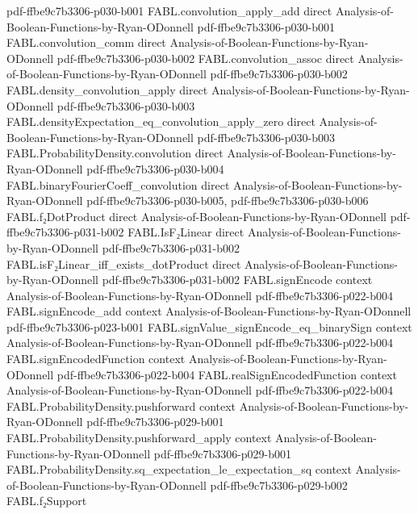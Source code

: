 \begin{theorem}
  {pdf-ffbe9c7b3306-p030-b001}
\proofstep
  {FABL.convolution_apply_add}
  {direct}
  {Analysis-of-Boolean-Functions-by-Ryan-ODonnell}
  {pdf-ffbe9c7b3306-p030-b001}
\proofstep
  {FABL.convolution_comm}
  {direct}
  {Analysis-of-Boolean-Functions-by-Ryan-ODonnell}
  {pdf-ffbe9c7b3306-p030-b002}
\proofstep
  {FABL.convolution_assoc}
  {direct}
  {Analysis-of-Boolean-Functions-by-Ryan-ODonnell}
  {pdf-ffbe9c7b3306-p030-b002}
\proofstep
  {FABL.density_convolution_apply}
  {direct}
  {Analysis-of-Boolean-Functions-by-Ryan-ODonnell}
  {pdf-ffbe9c7b3306-p030-b003}
\proofstep
  {FABL.densityExpectation_eq_convolution_apply_zero}
  {direct}
  {Analysis-of-Boolean-Functions-by-Ryan-ODonnell}
  {pdf-ffbe9c7b3306-p030-b003}
\proofstep
  {FABL.ProbabilityDensity.convolution}
  {direct}
  {Analysis-of-Boolean-Functions-by-Ryan-ODonnell}
  {pdf-ffbe9c7b3306-p030-b004}
\proofstep
  {FABL.binaryFourierCoeff_convolution}
  {direct}
  {Analysis-of-Boolean-Functions-by-Ryan-ODonnell}
  {pdf-ffbe9c7b3306-p030-b005,
    pdf-ffbe9c7b3306-p030-b006}
\proofstep
  {FABL.f₂DotProduct}
  {direct}
  {Analysis-of-Boolean-Functions-by-Ryan-ODonnell}
  {pdf-ffbe9c7b3306-p031-b002}
\proofstep
  {FABL.IsF₂Linear}
  {direct}
  {Analysis-of-Boolean-Functions-by-Ryan-ODonnell}
  {pdf-ffbe9c7b3306-p031-b002}
\proofstep
  {FABL.isF₂Linear_iff_exists_dotProduct}
  {direct}
  {Analysis-of-Boolean-Functions-by-Ryan-ODonnell}
  {pdf-ffbe9c7b3306-p031-b002}
\proofstep
  {FABL.signEncode}
  {context}
  {Analysis-of-Boolean-Functions-by-Ryan-ODonnell}
  {pdf-ffbe9c7b3306-p022-b004}
\proofstep
  {FABL.signEncode_add}
  {context}
  {Analysis-of-Boolean-Functions-by-Ryan-ODonnell}
  {pdf-ffbe9c7b3306-p023-b001}
\proofstep
  {FABL.signValue_signEncode_eq_binarySign}
  {context}
  {Analysis-of-Boolean-Functions-by-Ryan-ODonnell}
  {pdf-ffbe9c7b3306-p022-b004}
\proofstep
  {FABL.signEncodedFunction}
  {context}
  {Analysis-of-Boolean-Functions-by-Ryan-ODonnell}
  {pdf-ffbe9c7b3306-p022-b004}
\proofstep
  {FABL.realSignEncodedFunction}
  {context}
  {Analysis-of-Boolean-Functions-by-Ryan-ODonnell}
  {pdf-ffbe9c7b3306-p022-b004}
\proofstep
  {FABL.ProbabilityDensity.pushforward}
  {context}
  {Analysis-of-Boolean-Functions-by-Ryan-ODonnell}
  {pdf-ffbe9c7b3306-p029-b001}
\proofstep
  {FABL.ProbabilityDensity.pushforward_apply}
  {context}
  {Analysis-of-Boolean-Functions-by-Ryan-ODonnell}
  {pdf-ffbe9c7b3306-p029-b001}
\proofstep
  {FABL.ProbabilityDensity.sq_expectation_le_expectation_sq}
  {context}
  {Analysis-of-Boolean-Functions-by-Ryan-ODonnell}
  {pdf-ffbe9c7b3306-p029-b002}
\proofstep
  {FABL.f₂Support}

\end{theorem}
